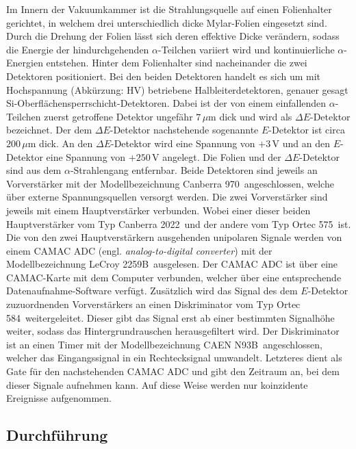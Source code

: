 Im Innern der Vakuumkammer ist die Strahlungsquelle auf einen Folienhalter gerichtet, in welchem drei unterschiedlich dicke Mylar-Folien eingesetzt sind.
Durch die Drehung der Folien lässt sich deren effektive Dicke verändern, sodass die Energie der hindurchgehenden $\alpha$-Teilchen variiert wird und kontinuierliche $\alpha$-Energien entstehen.
Hinter dem Folienhalter sind nacheinander die zwei Detektoren positioniert.
Bei den beiden Detektoren handelt es sich um mit Hochspannung (Abkürzung: HV) betriebene Halbleiterdetektoren, genauer gesagt Si-Oberflächensperrschicht-Detektoren.
Dabei ist der von einem einfallenden $\alpha$-Teilchen zuerst getroffene Detektor ungefähr $7\,\mu$m dick und wird als $\Delta E$-Detektor bezeichnet.
Der dem $\Delta E$-Detektor nachstehende sogenannte $E$-Detektor ist circa $200\,\mu$m dick.
An den $\Delta E$-Detektor wird eine Spannung von $+3\,$V und an den $E$-Detektor eine Spannung von $+250\,$V angelegt.
Die Folien und der $\Delta E$-Detektor sind aus dem $\alpha$-Strahlengang entfernbar.
Beide Detektoren sind jeweils an Vorverstärker mit der Modellbezeichnung \glqq Canberra 970\grqq\ angeschlossen, welche über externe Spannungsquellen versorgt werden.
Die zwei Vorverstärker sind jeweils mit einem Hauptverstärker verbunden.
Wobei einer dieser beiden Hauptverstärker vom Typ \glqq Canberra 2022\grqq\ und der andere vom Typ \glqq Ortec 575\grqq\ ist.
Die von den zwei Hauptverstärkern ausgehenden unipolaren Signale werden von einem CAMAC ADC (engl. \emph{analog-to-digital converter}) mit der Modellbezeichnung \glqq LeCroy 2259B\grqq\ ausgelesen.
Der CAMAC ADC ist über eine CAMAC-Karte mit dem Computer verbunden, welcher über eine entsprechende Datenaufnahme-Software verfügt.
Zusätzlich wird das Signal des dem $E$-Detektor zuzuordnenden Vorverstärkers an einen Diskriminator vom Typ \glqq Ortec 584\grqq\ weitergeleitet.
Dieser gibt das Signal erst ab einer bestimmten Signalhöhe weiter, sodass das Hintergrundrauschen herausgefiltert wird.
Der Diskriminator ist an einen Timer mit der Modellbezeichnung \glqq CAEN N93B\grqq\ angeschlossen, welcher das Eingangssignal in ein Rechtecksignal umwandelt.
Letzteres dient als Gate für den nachstehenden CAMAC ADC und gibt den Zeitraum an, bei dem dieser Signale aufnehmen kann.
Auf diese Weise werden nur koinzidente Ereignisse aufgenommen.



\subsection{Durchführung}

